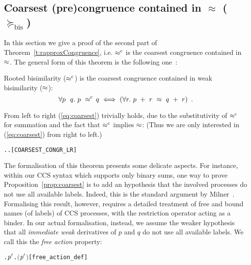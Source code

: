 
\subsection{Coarsest (pre)congruence contained in $\approx$ ($\succeq_{\mathrm{bis}}$)}
\label{s:coarsest}

In this section we give a proof of the second part of
Theorem~\ref{t:rapproxCongruence}, i.e. $\mathrel{\approx^{\rm{c}}}$ is the coarsest
congruence contained in $\approx$. 
The general form of this theorem is the following
one~\cite{van2005characterisation,Gorrieri:2015jt,Mil89}:
\begin{proposition}
\label{prop:coarsest}
  Rooted bisimilarity ($\mathrel{\approx^{\rm{c}}}$) is the coarsest congruence
    contained in weak bisimilarity ($\approx$):
  \begin{equation}
    \label{eq:coarsest}
\forall p\ \ q.\ p\ \rapprox\ \! q\ \Longleftrightarrow\ ( \forall r.\ p\ +\
r\ \approx\ q\ +\ r )\enspace.
\end{equation}
\end{proposition}
From left to right (\ref{eq:coarsest}) trivially holds, due to the substitutivity of
$\mathrel{\approx^{\rm{c}}}$ for summation and the fact that $\mathrel{\approx^{\rm{c}}}$ implies $\approx$: (Thus we are only interested in (\ref{eq:coarsest}) from right to left.)
\begin{alltt}
\HOLTokenTurnstile{} \HOLSymConst{\HOLTokenForall{}} .  \HOLSymConst{\HOLTokenObsCongr}  \HOLSymConst{\HOLTokenImp{}} \HOLSymConst{\HOLTokenForall{}}.  \HOLSymConst{\ensuremath{+}}  \HOLSymConst{\HOLTokenWeakEQ}  \HOLSymConst{\ensuremath{+}} \hfill{[COARSEST_CONGR_LR]}
\end{alltt}

The formalisation of this theorem presents some 
delicate aspects. For instance, 
within our CCS syntax which supports only binary sums,
one way to prove Proposition~\ref{prop:coarsest} is
to add an hypothesis that
 the involved processes do not use all available labels.
 Indeed, this is the standard argument by Milner~\citep[p.~153]{Mil89}.
%
 Formalising this result, however, requires a detailed treatment of
 free and bound names (of labels) of CCS
processes, with the restriction operator acting as a binder.
In our actual formalisation, instead,
we assume the weaker hypothesis that all \emph{immediate weak} derivatives of
$p$ and $q$ do not use all available labels.
We call this the \emph{free action} property:
\begin{alltt}
     \HOLTokenDefEquality{} \HOLSymConst{\HOLTokenExists{}}. \HOLSymConst{\HOLTokenForall{}}\ensuremath{\HOLBoundVar{p}\sp{\prime}}. \HOLSymConst{\HOLTokenNeg{}}\ensuremath{(} \HOLTokenWeakTransBegin{} \HOLTokenWeakTransEnd \ensuremath{\HOLBoundVar{p}\sp{\prime}}\ensuremath{)}\hfill{[free_action_def]}
\end{alltt}

